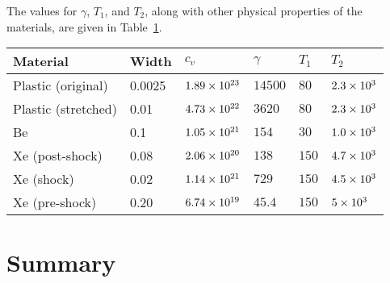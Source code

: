 The values for $\gamma$, $T_1$, and $T_2$, along with other physical properties
of the materials, are given in Table~\ref{tab:seriousPhysics}.
\begin{table}[htb]
  \centering
  \begin{tabular}{llllll}
\toprule
 Material & Width & $c_v$ & $\gamma$ & $T_1$ & $T_2$
\\ \midrule
Plastic (original) & 0.0025 & $1.89\times 10^{23}$ & $14500$ & $80$ & $2.3\times 10^{3}$\\
Plastic (stretched) & 0.01 & $4.73\times 10^{22}$ & $3620$ & $80$ & $2.3\times 10^{3}$\\
Be & 0.1 & $1.05\times 10^{21}$ & $154$ & $30$ & $1.0\times 10^{3}$\\
Xe (post-shock) & 0.08 & $2.06\times 10^{20}$ & $138$ & $150$ & $4.7\times 10^{3}$\\
Xe (shock) & 0.02 & $1.14\times 10^{21}$ & $729$ & $150$ & $4.5\times 10^{3}$\\
Xe (pre-shock) & 0.20 & $6.74\times 10^{19}$ & $45.4$ & $150$ & $5\times 10^{3}$
\\ \bottomrule
  \end{tabular}
  \label{tab:seriousPhysics}
\end{table}


\section{Summary}

